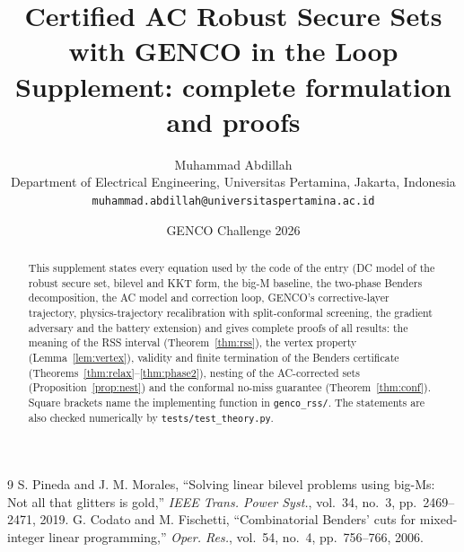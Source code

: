 \documentclass[11pt,a4paper]{article}
\title{Certified AC Robust Secure Sets with GENCO in the Loop\\[4pt]
\large Supplement: complete formulation and proofs}
\author{Muhammad Abdillah\\
Department of Electrical Engineering, Universitas Pertamina, Jakarta, Indonesia\\
\texttt{muhammad.abdillah@universitaspertamina.ac.id}}
\date{GENCO Challenge 2026}
\theoremstyle{remark}
\begin{document}
\maketitle
\sloppy
\begin{abstract}
This supplement states every equation used by the code of the entry (DC model of the
robust secure set, bilevel and KKT form, the big-M baseline, the two-phase Benders
decomposition, the AC model and correction loop, GENCO's corrective-layer trajectory,
physics-trajectory recalibration with split-conformal screening, the gradient adversary
and the battery extension) and gives complete proofs of all results: the meaning of the
RSS interval (Theorem~\ref{thm:rss}), the vertex property (Lemma~\ref{lem:vertex}), validity
and finite termination of the Benders certificate (Theorems~\ref{thm:relax}--\ref{thm:phase2}),
nesting of the AC-corrected sets (Proposition~\ref{prop:nest}) and the conformal no-miss
guarantee (Theorem~\ref{thm:conf}). Square brackets name the implementing function in
\texttt{genco\_rss/}. The statements are also checked numerically by
\texttt{tests/test\_theory.py}.
\end{abstract}
\tableofcontents



\begin{thebibliography}{9}
 S. Pineda and J. M. Morales, ``Solving linear bilevel problems
using big-Ms: Not all that glitters is gold,'' \emph{IEEE Trans. Power Syst.}, vol.~34,
no.~3, pp.~2469--2471, 2019.
 G. Codato and M. Fischetti, ``Combinatorial Benders' cuts for
mixed-integer linear programming,'' \emph{Oper. Res.}, vol.~54, no.~4, pp.~756--766, 2006.
\end{thebibliography}
\end{document}
